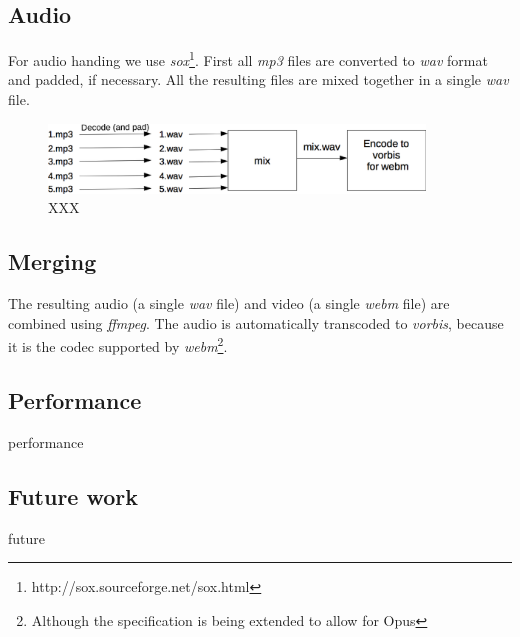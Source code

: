 \documentclass[twoside,openright,a4paper,12pt,english]{article}
\begin{document}
\subsection{Audio}
For audio handing we use \emph{sox}\footnote{http://sox.sourceforge.net/sox.html}.
First all \emph{mp3} files are converted to \emph{wav} format and padded, if
necessary. All the resulting files are mixed together in a single \emph{wav}
file.

\begin{figure}[h]
    \includegraphics[width=10cm]{./pics/audio-popro.eps}
    \caption{XXX}
\end{figure}


\subsection{Merging}
The resulting audio (a single \emph{wav} file) and video (a single \emph{webm} file)
are combined using \emph{ffmpeg}. The audio is automatically transcoded to \emph{vorbis}, because it is the codec supported by \emph{webm}\footnote{Although the specification is being extended to allow for Opus}.

\subsection{Performance}
performance


\subsection{Future work}
future
\end{document}
